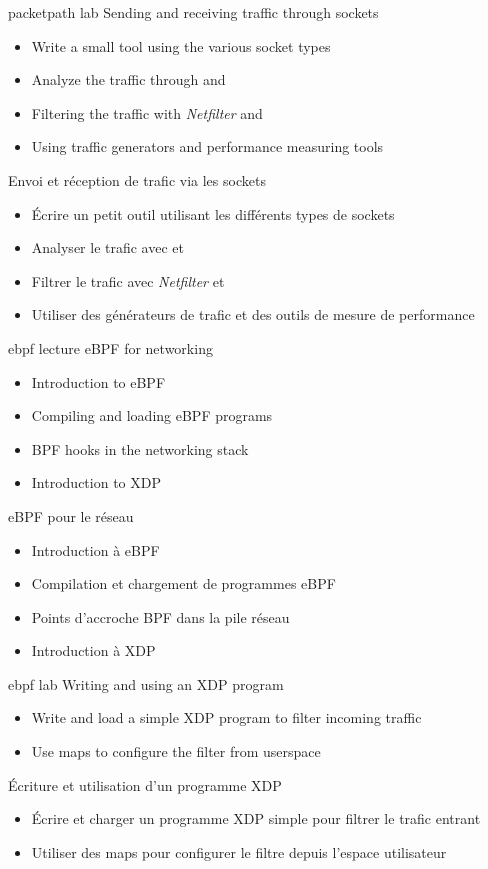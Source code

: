 {packetpath}
{lab}
{Sending and receiving traffic through sockets}
{
  \begin{itemize}
  \item Write a small tool using the various socket types
  \item Analyze the traffic through  and 
  \item Filtering the traffic with {\em Netfilter} and 
  \item Using traffic generators and performance measuring tools
  \end{itemize}
}
{Envoi et réception de trafic via les sockets}
{
  \begin{itemize}
  \item Écrire un petit outil utilisant les différents types de
    sockets
  \item Analyser le trafic avec  et 
  \item Filtrer le trafic avec {\em Netfilter} et 
  \item Utiliser des générateurs de trafic et des outils de mesure de
    performance
  \end{itemize}
}

{ebpf}
{lecture}
{eBPF for networking}
{
  \begin{itemize}
  \item Introduction to eBPF
  \item Compiling and loading eBPF programs
  \item BPF hooks in the networking stack
  \item Introduction to XDP
  \end{itemize}
}
{eBPF pour le réseau}
{
  \begin{itemize}
  \item Introduction à eBPF
  \item Compilation et chargement de programmes eBPF
  \item Points d'accroche BPF dans la pile réseau
  \item Introduction à XDP
  \end{itemize}
}

{ebpf}
{lab}
{Writing and using an XDP program}
{
  \begin{itemize}
  \item Write and load a simple XDP program to filter incoming traffic
  \item Use maps to configure the filter from userspace
  \end{itemize}
}
{Écriture et utilisation d’un programme XDP}
{
  \begin{itemize}
  \item Écrire et charger un programme XDP simple pour filtrer le
    trafic entrant
  \item Utiliser des maps pour configurer le filtre depuis l’espace
    utilisateur
  \end{itemize}
}

